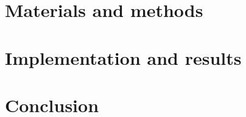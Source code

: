 \documentclass[12pt,paper=a4,oneside,cleardoubleage=plain,final]{report}
\newcommand{\comment}[1]{}
\begin{document}
\chapter{Materials and methods}


\chapter{Implementation and results}
\label{chap:4}


\comment{summary, conclusion and recommendation}
\chapter{Conclusion}





\comment {
Definition. An appendix contains supplementary material that is not an essential part of the text itself but which may be helpful in providing a more comprehensive understanding of the research problem or it is information that is too cumbersome to be included in the body of the paper.
}

\renewcommand{\bibname}{References}



%
\end{document}
